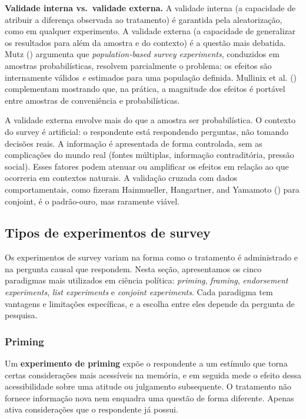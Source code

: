 \documentclass[
]{article}
\begin{document}
\textbf{Validade interna vs.~validade externa.} A validade interna (a capacidade de atribuir a diferença observada ao tratamento) é garantida pela aleatorização, como em qualquer experimento. A validade externa (a capacidade de generalizar os resultados para além da amostra e do contexto) é a questão mais debatida. Mutz () argumenta que \emph{population-based survey experiments}, conduzidos em amostras probabilísticas, resolvem parcialmente o problema: os efeitos são internamente válidos \emph{e} estimados para uma população definida. Mullinix et al. () complementam mostrando que, na prática, a magnitude dos efeitos é portável entre amostras de conveniência e probabilísticas.

A validade externa envolve mais do que a amostra ser probabilística. O contexto do survey é artificial: o respondente está respondendo perguntas, não tomando decisões reais. A informação é apresentada de forma controlada, sem as complicações do mundo real (fontes múltiplas, informação contraditória, pressão social). Esses fatores podem atenuar ou amplificar os efeitos em relação ao que ocorreria em contextos naturais. A validação cruzada com dados comportamentais, como fizeram Hainmueller, Hangartner, and Yamamoto () para conjoint, é o padrão-ouro, mas raramente viável.

\subsection{Tipos de experimentos de survey}\label{tipos-de-experimentos-de-survey}

Os experimentos de survey variam na forma como o tratamento é administrado e na pergunta causal que respondem. Nesta seção, apresentamos os cinco paradigmas mais utilizados em ciência política: \emph{priming}, \emph{framing}, \emph{endorsement experiments}, \emph{list experiments} e \emph{conjoint experiments}. Cada paradigma tem vantagens e limitações específicas, e a escolha entre eles depende da pergunta de pesquisa.

\subsubsection{Priming}\label{priming}

Um \textbf{experimento de priming} expõe o respondente a um estímulo que torna certas considerações mais acessíveis na memória, e em seguida mede o efeito dessa acessibilidade sobre uma atitude ou julgamento subsequente. O tratamento não fornece informação nova nem enquadra uma questão de forma diferente. Apenas ativa considerações que o respondente já possui.
\end{document}

